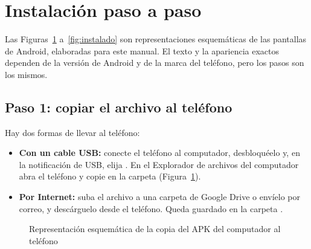 \documentclass[stu,letterpaper,12pt,donotrepeattitle,floatsintext]{apa7}
\begin{document}
\section{Instalación paso a paso}

Las Figuras~\ref{fig:transferir} a~\ref{fig:instalado} son representaciones esquemáticas de las
pantallas de Android, elaboradas para este manual. El texto y la apariencia exactos dependen de la
versión de Android y de la marca del teléfono, pero los pasos son los mismos.

\subsection{Paso 1: copiar el archivo al teléfono}

Hay dos formas de llevar  al teléfono:

\begin{itemize}
  \item \textbf{Con un cable USB:} conecte el teléfono al computador, desbloquéelo y, en la
        notificación de USB, elija . En el Explorador de archivos
        del computador abra el teléfono y copie  en la carpeta 
        (Figura~\ref{fig:transferir}).
  \item \textbf{Por Internet:} suba el archivo a una carpeta de Google Drive o envíelo por correo,
        y descárguelo desde el teléfono. Queda guardado en la carpeta .
\end{itemize}

\begin{figure}
  \caption{Representación esquemática de la copia del APK del computador al teléfono}\label{fig:transferir}
  \centering
\end{figure}
\end{document}
